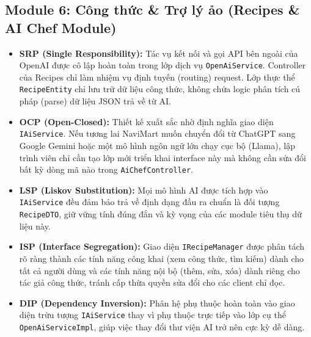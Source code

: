 \documentclass[12pt,a4paper]{article}
\begin{document}
\subsection{Module 6: Công thức \& Trợ lý ảo (Recipes \& AI Chef Module)}
\begin{itemize}
    \item \textbf{SRP (Single Responsibility):} Tác vụ kết nối và gọi API bên ngoài của OpenAI được cô lập hoàn toàn trong lớp dịch vụ \texttt{OpenAiService}. Controller của Recipes chỉ làm nhiệm vụ định tuyến (routing) request. Lớp thực thể \texttt{RecipeEntity} chỉ lưu trữ dữ liệu công thức, không chứa logic phân tích cú pháp (parse) dữ liệu JSON trả về từ AI.
    \item \textbf{OCP (Open-Closed):} Thiết kế xuất sắc nhờ định nghĩa giao diện \texttt{IAiService}. Nếu tương lai NaviMart muốn chuyển đổi từ ChatGPT sang Google Gemini hoặc một mô hình ngôn ngữ lớn chạy cục bộ (Llama), lập trình viên chỉ cần tạo lớp mới triển khai interface này mà không cần sửa đổi bất kỳ dòng mã nào trong \texttt{AiChefController}.
    \item \textbf{LSP (Liskov Substitution):} Mọi mô hình AI được tích hợp vào \texttt{IAiService} đều đảm bảo trả về định dạng đầu ra chuẩn là đối tượng \texttt{RecipeDTO}, giữ vững tính đúng đắn và kỳ vọng của các module tiêu thụ dữ liệu này.
    \item \textbf{ISP (Interface Segregation):} Giao diện \texttt{IRecipeManager} được phân tách rõ ràng thành các tính năng công khai (xem công thức, tìm kiếm) dành cho tất cả người dùng và các tính năng nội bộ (thêm, sửa, xóa) dành riêng cho tác giả công thức, tránh cấp thừa quyền sửa đổi cho các client chỉ đọc.
    \item \textbf{DIP (Dependency Inversion):} Phân hệ phụ thuộc hoàn toàn vào giao diện trừu tượng \texttt{IAiService} thay vì phụ thuộc trực tiếp vào lớp cụ thể \texttt{OpenAiServiceImpl}, giúp việc thay đổi thư viện AI trở nên cực kỳ dễ dàng.
\end{itemize}
\end{document}
